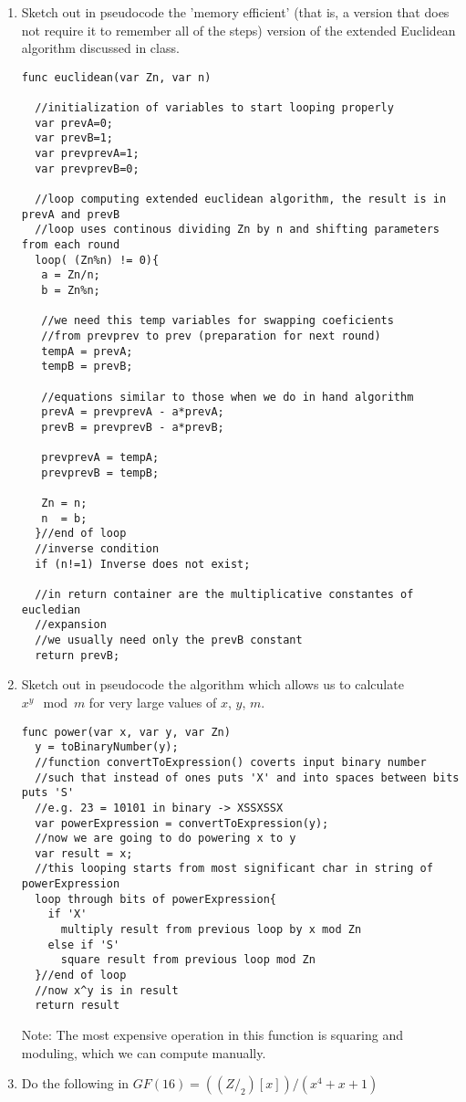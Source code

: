 \documentclass[5pt]{article}
\begin{document}
\maketitle

\begin{enumerate}
  \item Sketch out in pseudocode the 'memory efficient' (that is, a version
  that does not require it to remember all of the steps) version of the extended Euclidean
algorithm discussed in class.

\begin{verbatim}
func euclidean(var Zn, var n)

  //initialization of variables to start looping properly
  var prevA=0;
  var prevB=1;
  var prevprevA=1;
  var prevprevB=0;
  
  //loop computing extended euclidean algorithm, the result is in prevA and prevB
  //loop uses continous dividing Zn by n and shifting parameters from each round
  loop( (Zn%n) != 0){
   a = Zn/n;
   b = Zn%n;
   
   //we need this temp variables for swapping coeficients
   //from prevprev to prev (preparation for next round)
   tempA = prevA;
   tempB = prevB;
   
   //equations similar to those when we do in hand algorithm
   prevA = prevprevA - a*prevA;
   prevB = prevprevB - a*prevB;
   
   prevprevA = tempA;
   prevprevB = tempB;
   
   Zn = n;
   n  = b;    
  }//end of loop
  //inverse condition
  if (n!=1) Inverse does not exist;
  
  //in return container are the multiplicative constantes of eucledian
  //expansion
  //we usually need only the prevB constant
  return prevB; 
\end{verbatim}
\newpage
  \item Sketch out in pseudocode the algorithm which allows us to calculate
  $x^y \mod m$ for very large values of $x$, $y$, $m$.
\begin{verbatim}
func power(var x, var y, var Zn)
  y = toBinaryNumber(y);
  //function convertToExpression() coverts input binary number
  //such that instead of ones puts 'X' and into spaces between bits puts 'S'
  //e.g. 23 = 10101 in binary -> XSSXSSX
  var powerExpression = convertToExpression(y);
  //now we are going to do powering x to y
  var result = x;
  //this looping starts from most significant char in string of powerExpression
  loop through bits of powerExpression{
    if 'X'
      multiply result from previous loop by x mod Zn 
    else if 'S'
      square result from previous loop mod Zn
  }//end of loop
  //now x^y is in result
  return result
\end{verbatim}
Note: The most expensive operation in this function is squaring and moduling,
which we can compute manually.
  \item Do the following in
$GF (16) = ((Z/_2)[x])/(x^4 + x + 1)$



\end{enumerate}
\end{document}
